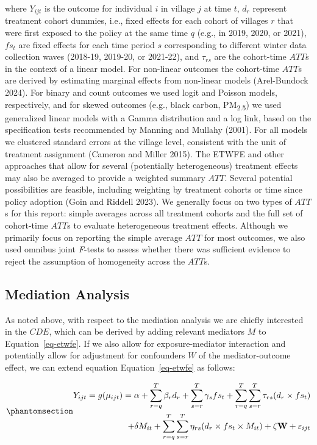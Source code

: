\documentclass[
  letterpaper,
  DIV=11,
  numbers=noendperiod]{scrartcl}
\begin{document}
where \(Y_{ijt}\) is the outcome for individual \(i\) in village \(j\)
at time \(t\), \(d_{r}\) represent treatment cohort dummies, i.e., fixed
effects for each cohort of villages \(r\) that were first exposed to the
policy at the same time \(q\) (e.g., in 2019, 2020, or 2021), \(fs_{t}\)
are fixed effects for each time period \(s\) corresponding to different
winter data collection waves (2018-19, 2019-20, or 2021-22), and
\(\tau_{rs}\) are the cohort-time \(ATT\)s in the context of a linear
model. For non-linear outcomes the cohort-time \(ATT\)s are derived by
estimating marginal effects from non-linear models (Arel-Bundock 2024).
For binary and count outcomes we used logit and Poisson models,
respectively, and for skewed outcomes (e.g., black carbon,
PM\textsubscript{2.5}) we used generalized linear models with a Gamma
distribution and a log link, based on the specification tests
recommended by Manning and Mullahy (2001). For all models we clustered
standard errors at the village level, consistent with the unit of
treatment assignment (Cameron and Miller 2015). The ETWFE and other
approaches that allow for several (potentially heterogeneous) treatment
effects may also be averaged to provide a weighted summary \(ATT\).
Several potential possibilities are feasible, including weighting by
treatment cohorts or time since policy adoption (Goin and Riddell 2023).
We generally focus on two types of \(ATT\)s for this report: simple
averages across all treatment cohorts and the full set of cohort-time
\(ATT\)s to evaluate heterogeneous treatment effects. Although we
primarily focus on reporting the simple average \(ATT\) for most
outcomes, we also used omnibus joint \emph{F}-tests to assess whether
there was sufficient evidence to reject the assumption of homogeneity
across the \(ATT\)s.

\subsection{Mediation Analysis}\label{mediation-analysis}

As noted above, with respect to the mediation analysis we are chiefly
interested in the \(CDE\), which can be derived by adding relevant
mediators \(M\) to Equation~\ref{eq-etwfe}. If we also allow for
exposure-mediator interaction and potentially allow for adjustment for
confounders \(W\) of the mediator-outcome effect, we can extend equation
Equation~\ref{eq-etwfe} as follows:

\begin{equation}\phantomsection\label{eq-etwfem}{
\begin{aligned}
Y_{ijt}=g(\mu_{ijt}) = \alpha + \sum_{r=q}^{T} \beta_{r} d_{r} + \sum_{s=r}^{T} \gamma_{s} fs_{t}+ \sum_{r=q}^{T} \sum_{s=r}^{T} \tau_{rs} (d_{r} \times fs_{t}) \\ + \delta M_{it} + \sum_{r=q}^{T} \sum_{s=r}^{T} \eta_{rs} (d_{r} \times fs_{t} \times M_{it}) + \zeta \mathbf{W} + \varepsilon_{ijt}
\end{aligned}
}\end{equation}
\end{document}
